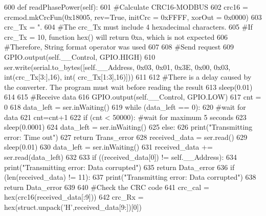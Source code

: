 \begin{DoxyCode}
600     \textcolor{keyword}{def }readPhasePower(self):
601         \textcolor{comment}{#Calculate CRC16-MODBUS
}
602         crc16 = crcmod.mkCrcFun(0x18005, rev=\textcolor{keyword}{True}, initCrc = 0xFFFF, xorOut = 0x0000)
603         crc\_Tx = \textcolor{stringliteral}{".%
604         \textcolor{comment}{#The crc\_Tx must include 4 hexadecimal characters.
}
605         \textcolor{comment}{#If crc\_Tx =  10, function hex() will return 0xa, which is not expected
}
606         \textcolor{comment}{#Therefore, String format operator was used
}
607     
608         \textcolor{comment}{#Send request
}
609         GPIO.output(self.\_\_Control, GPIO.HIGH)
610         ser.write(serial.to\_bytes([self.\_\_Address, 0x03, 0x01, 0x3E, 0x00, 0x03, int(crc\_Tx[3:],16), int(
      crc\_Tx[1:3],16)]))
611     
612         \textcolor{comment}{#There is a delay caused by the converter. The program must wait before reading the result
}
613         sleep(0.01)
614     
615         \textcolor{comment}{#Receive data
}
616         GPIO.output(self.\_\_Control, GPIO.LOW)
617         cnt = 0
618         data\_left = ser.inWaiting()
619         \textcolor{keywordflow}{while} (data\_left == 0):
620             \textcolor{comment}{#wait for data
}
621             cnt=cnt+1
622             \textcolor{keywordflow}{if} (cnt < 50000): \textcolor{comment}{#wait for maximum 5 seconds
}
623                 sleep(0.0001)
624                 data\_left = ser.inWaiting()
625             \textcolor{keywordflow}{else}:
626                 print(\textcolor{stringliteral}{"Transmitting error: Time out"})
627                 \textcolor{keywordflow}{return} Trans\_error
628         received\_data = ser.read()
629         sleep(0.01)
630         data\_left = ser.inWaiting()
631         received\_data += ser.read(data\_left)
632         
633         \textcolor{keywordflow}{if} ((received\_data[0]) != self.\_\_Address):
634             print(\textcolor{stringliteral}{"Transmitting error: Data corrupted"})
635             \textcolor{keywordflow}{return} Data\_error
636         \textcolor{keywordflow}{if} (len(received\_data) != 11):
637             print(\textcolor{stringliteral}{"Transmitting error: Data corrupted"})
638             \textcolor{keywordflow}{return} Data\_error
639         
640         \textcolor{comment}{#Check the CRC code
}
641         crc\_cal = hex(crc16(received\_data[:9]))
642         crc\_Rx = hex(struct.unpack(\textcolor{stringliteral}{'H'},received\_data[9:])[0])
}
\end{DoxyCode}
